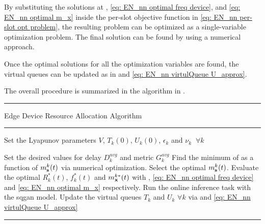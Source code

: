By substituting the solutions at , \eqref{eq: EN_nn optimal freq device}, and \eqref{eq: EN_nn optimal m_x} inside the per-slot objective function in \eqref{eq: EN_nn per-slot opt problem}, the resulting problem can be optimized as a single-variable optimization problem. The final solution can be found by using a numerical approach.

Once the optimal solutions for all the optimization variables are found, the virtual queues can be updated as in  and \eqref{eq: EN_nn virtulQueue U_approx}.

The overall procedure is summarized in the algorithm in .


\begin{table}[ht]
    \centering
    \rule{\textwidth}{0.4pt} %
    \vspace{-22pt} %
    \caption{Edge Device Resource Allocation Algorithm}
    \vspace{-10pt} %
    \rule{\textwidth}{0.4pt} %
    \vspace{-15pt} %
        \begin{algorithmic}[1]
            \item Set the Lyapunov parameters $V$, $T_k(0)$, $U_k(0)$, $\epsilon_k$ and $\nu_k \;\;\forall k$
            \item Set the desired values for delay $D_k^{avg}$ and metric $G_k^{avg}$
                \State Find the minimum of  as a function of $m_{\mathbf{s}}^k(t)$ via numerical optimization.
                \State Select the optimal $m_{\mathbf{s}}^k(t)$.
                \State Evaluate the optimal $R_k^*(t)$, $f_k^*(t)$ and $m_{\mathbf{x}}^{k*}(t)$ with , \eqref{eq: EN_nn optimal freq device} and \eqref{eq: EN_nn optimal m_x} respectively.
                \State Run the online inference task with the \gls{sqgan} model.
                \State Update  the virtual queues $T_k$ and $U_k$ $\forall k$ via  and \eqref{eq: EN_nn virtulQueue U_approx}
            \EndFor
        \end{algorithmic}
    \vspace{-10pt} %
    \rule{\textwidth}{0.4pt} %
    \label{tab: EN_nn algorithm}
\end{table}
